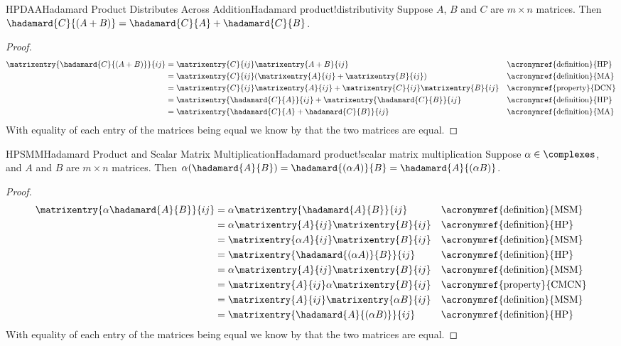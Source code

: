 %
\begin{theorem}{HPDAA}{Hadamard Product Distributes Across Addition}{Hadamard product!distributivity} 
Suppose $A$, $B$ and $C$ are $m \times n$ matrices. Then $\hadamard{C}{(A + B)} = \hadamard{C}{A} + \hadamard{C}{B}$.
\end{theorem}
\begin{proof} 
\begin{align*}
\matrixentry{\hadamard{C}{(A + B)}}{ij} 
&=  \matrixentry{C}{ij}\matrixentry{A + B}{ij} 
&& \text{\acronymref{definition}{HP}} \\ 
%
&=  \matrixentry{C}{ij}(\matrixentry{A}{ij} + \matrixentry{B}{ij}) 
&& \text{\acronymref{definition}{MA}} \\
%
&=  \matrixentry{C}{ij}\matrixentry{A}{ij} + \matrixentry{C}{ij}\matrixentry{B}{ij} 
&& \text{\acronymref{property}{DCN}} \\
%
&=  \matrixentry{\hadamard{C}{A}}{ij} + \matrixentry{\hadamard{C}{B}}{ij} 
&& \text{\acronymref{definition}{HP}} \\
%
&=  \matrixentry{\hadamard{C}{A} + \hadamard{C}{B}}{ij} 
&& \text{\acronymref{definition}{MA}} 
\end{align*}
With equality of each entry of the matrices being equal we know by  that the two matrices are equal.
\end{proof}
%
\begin{theorem}{HPSMM}{Hadamard Product and Scalar Matrix Multiplication}{Hadamard product!scalar matrix multiplication} 
Suppose $\alpha \in \complexes$, and $A$ and $B$ are $m \times n$ matrices. Then $\alpha (\hadamard{A}{B}) = \hadamard{(\alpha A)}{B} = \hadamard{A}{(\alpha B)}$.
\end{theorem}
\begin{proof} 
\begin{align*}
\matrixentry{\alpha \hadamard{A}{B}}{ij} 
&= \alpha \matrixentry{\hadamard{A}{B}}{ij}  
&& \text{\acronymref{definition}{MSM}} \\
%
&=  \alpha \matrixentry{A}{ij}\matrixentry{B}{ij}  
&& \text{\acronymref{definition}{HP}} \\
%
&=  \matrixentry{\alpha A}{ij}\matrixentry{B}{ij}  
&& \text{\acronymref{definition}{MSM}} \\
%
&= \matrixentry{\hadamard{(\alpha A)}{B}}{ij}  
&& \text{\acronymref{definition}{HP}} \\
%
&=  \alpha \matrixentry{A}{ij}\matrixentry{B}{ij}  
&& \text{\acronymref{definition}{MSM}} \\
%
&=  \matrixentry{A}{ij} \alpha \matrixentry{B}{ij}  
&& \text{\acronymref{property}{CMCN}} \\
%
&=  \matrixentry{A}{ij}\matrixentry{\alpha B}{ij}  
&& \text{\acronymref{definition}{MSM}}\\
%
&=  \matrixentry{\hadamard{A}{(\alpha B)}}{ij}  
&& \text{\acronymref{definition}{HP}}
\end{align*}
With equality of each entry of the matrices being equal we know by  that the two matrices are equal.
\end{proof}
